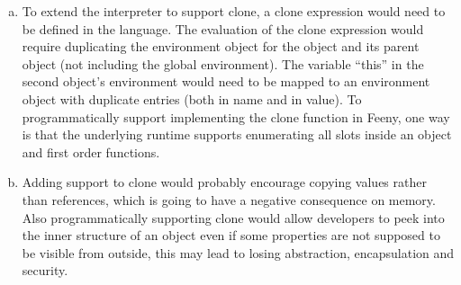 \documentclass[notitlepage]{report}
\begin{document}
\begin{enumerate}
\begin{enumerate}[(a)]
			\item To extend the interpreter to support clone, a clone expression would need to be defined in the language.  The evaluation of the clone expression would require duplicating the environment object for the object and its parent object (not including the global environment).  The variable ``this'' in the second object's environment would need to be mapped to an environment object with duplicate entries (both in name and in value). To programmatically support implementing the clone function in Feeny, one way is that the underlying runtime supports enumerating all slots inside an object and first order functions.
			\item Adding support to clone would probably encourage copying values rather than references, which is going to have a negative consequence on memory. Also programmatically supporting clone would allow developers to peek into the inner structure of an object even if some properties are not supposed to be visible from outside, this may lead to losing abstraction, encapsulation and security.
		\end{enumerate}
\end{enumerate}
\end{document}
